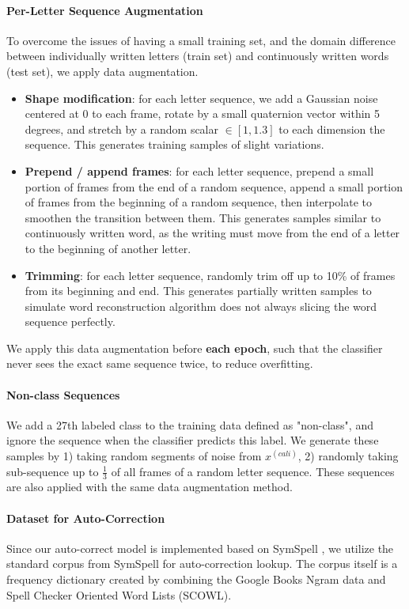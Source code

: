 \documentclass{article}
\begin{document}
\begin{multicols*}{2}
\paragraph{Per-Letter Sequence Augmentation}
To overcome the issues of having a small training set, and the domain difference between individually written letters (train set) and continuously written words (test set), we apply data augmentation.

\begin{itemize}[leftmargin=*]
\item \textbf{Shape modification}: for each letter sequence, we add a Gaussian noise centered at 0 to each frame, rotate by a small quaternion vector within 5 degrees, and stretch by a random scalar $\in [1, 1.3]$ to each dimension the sequence. This generates training samples of slight variations.
\item \textbf{Prepend / append frames}: for each letter sequence, prepend a small portion of frames from the end of a random sequence, append a small portion of frames from the beginning of a random sequence, then interpolate to smoothen the transition between them. This generates samples similar to continuously written word, as the writing must move from the end of a letter to the beginning of another letter.
\item \textbf{Trimming}: for each letter sequence, randomly trim off up to 10\% of frames from its beginning and end. This generates partially written samples to simulate word reconstruction algorithm does not always slicing the word sequence perfectly.
\end{itemize}

We apply this data augmentation before \textbf{each epoch}, such that the classifier never sees the exact same sequence twice, to reduce overfitting.

\paragraph{Non-class Sequences} 
We add a 27th labeled class to the training data defined as "non-class", and ignore the sequence when the classifier predicts this label. We generate these samples by 1) taking random segments of noise from $x^{(cali)}$, 2) randomly taking sub-sequence up to $\frac{1}{3}$ of all frames of a random letter sequence. These sequences are also applied with the same data augmentation method.


\paragraph{Dataset for Auto-Correction}  
Since our auto-correct model is implemented based on SymSpell \cite{SymSpell}, we utilize the standard corpus from SymSpell for auto-correction lookup. The corpus itself is a frequency dictionary created by combining the Google Books Ngram data and Spell Checker Oriented Word Lists (SCOWL). 



\end{multicols*}
\end{document}
